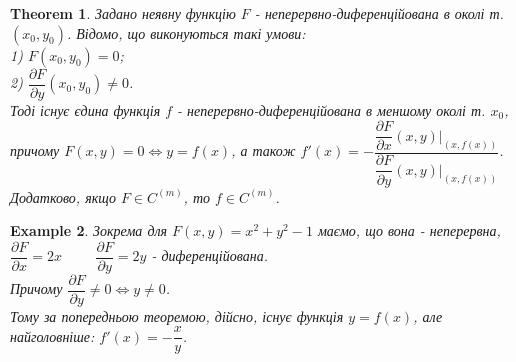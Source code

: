 \documentclass[a4paper, 10pt]{article}
\def\departial#1#2{\dfrac{\partial {#1}}{\partial {#2}}}
\theoremstyle{theoremdd}
\newtheorem{theorem}{Theorem}[subsection]
\theoremstyle{theoremdd}
\theoremstyle{theoremdd}
\theoremstyle{theoremdd}
\newtheorem{example}[theorem]{Example}
\theoremstyle{theoremdd}
\theoremstyle{theoremdd}
\theoremstyle{theoremdd}
\theoremstyle{theoremdd}
\begin{document}
\begin{theorem}
Задано неявну функцію $F$ - неперервно-диференційована в околі т. $(x_0,y_0)$. Відомо, що виконуються такі умови:\\
1) $F(x_0,y_0)=0$;\\
2) $\departial{F}{y}(x_0,y_0) \neq 0$.\\
Тоді існує єдина функція $f$ - неперервно-диференційована в меншому околі т. $x_0$, причому $F(x,y) = 0 \iff y = f(x)$, а також $f'(x) = -\dfrac{\departial{F}{x}(x,y) \Big|_{(x,f(x))}}{\departial{F}{y}(x,y) \Big|_{(x,f(x))}}$.
\bigskip \\
Додатково, якщо $F \in C^{(m)}$, то $f \in C^{(m)}$.
\iffalse
Тоді справедливо наступне:\\
I) $\exists \delta_1,\delta_2 > 0: (x_0-\delta_1,x_0+\delta_1) \times (y_0-\delta_2,y_0+\delta_2) \subset U(x_0,y_0)$\\
II) $\exists f: (x_0-\delta_1,x_0+\delta_1) \to (y_0-\delta_2,y_0+\delta_2)$, така, що \\ $f \in C^{(m)}((x_0-\delta_1,x_0+\delta_1))$ та\\
$(x,y) \in (x_0-\delta_1,x_0+\delta_1) \times (y_0-\delta_2,y_0+\delta_2) \iff \begin{cases} x \in (x_0-\delta_1,x_0+\delta_1) \\ y \in (y_0-\delta_2,y_0+\delta_2) \end{cases}$\\
III) $F(x,y) = 0 \iff y=f(x)$\\
IV) $f'(x) = -\dfrac{\departial{F}{x}(x,y) \Big|_{(x,f(x))}}{\departial{F}{y}(x,y) \Big|_{(x,f(x))}}$\\
\textit{Без доведення. Можна подивитись у Зоріча зі 20 сторінками}
\fi
\end{theorem}

\begin{example}
Зокрема для $F(x,y) = x^2+y^2-1$ маємо, що вона - неперервна,\\
$\departial{F}{x} = 2x \hspace{1cm} \departial{F}{y} = 2y$ - диференційована.\\
Причому $\departial{F}{y} \neq 0 \iff y \neq 0$.\\
Тому за попередньою теоремою, дійсно, існує функція $y = f(x)$, але найголовніше: $f'(x) = -\dfrac{x}{y}$.
\end{example}
\end{document}
